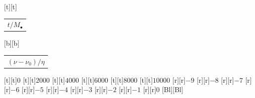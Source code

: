 %    
%
%
\begin{psfrags}%
\psfragscanon%
%
[t][t]{\color[rgb]{0,0,0}\setlength{\tabcolsep}{0pt}\begin{tabular}{c}{\Large$t/M_\bullet$}\end{tabular}}%
[b][b]{\color[rgb]{0,0,0}\setlength{\tabcolsep}{0pt}\begin{tabular}{c}{\Large$(\nu - \nu_0)/\eta$}\end{tabular}}%
%
[t][t]{$0$}%
[t][t]{$2000$}%
[t][t]{$4000$}%
[t][t]{$6000$}%
[t][t]{$8000$}%
[t][t]{$10000$}%
%
[r][r]{$-9$}%
[r][r]{$-8$}%
[r][r]{$-7$}%
[r][r]{$-6$}%
[r][r]{$-5$}%
[r][r]{$-4$}%
[r][r]{$-3$}%
[r][r]{$-2$}%
[r][r]{$-1$}%
[r][r]{$0$}%
[Bl][Bl]{}%
%
%
\end{psfrags}%
%
